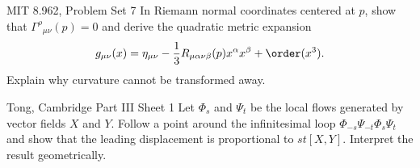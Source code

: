 \begin{exercise}{MIT 8.962, Problem Set 7}
In Riemann normal coordinates centered at \(p\), show that
\(\Gamma^\rho{}_{\mu\nu}(p)=0\) and derive the quadratic metric expansion
\[
g_{\mu\nu}(x)=\eta_{\mu\nu}
-\frac13R_{\mu\alpha\nu\beta}(p)x^\alpha x^\beta+\order(x^3).
\]
Explain why curvature cannot be transformed away.
\end{exercise}

\begin{exercise}{Tong, Cambridge Part III Sheet 1}
Let \(\Phi_s\) and \(\Psi_t\) be the local flows generated by vector fields
\(X\) and \(Y\).  Follow a point around the infinitesimal loop
\(\Phi_{-s}\Psi_{-t}\Phi_s\Psi_t\) and show that the leading displacement is
proportional to \(st[X,Y]\).  Interpret the result geometrically.
\end{exercise}
